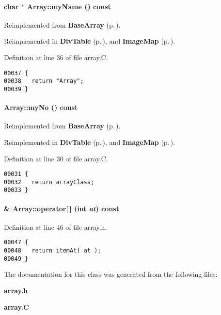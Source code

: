 \paragraph{\setlength{\rightskip}{0pt plus 5cm}char $\ast$ Array::my\-Name () const\hspace{0.3cm}{\tt  [virtual]}}\hfill



Reimplemented from {\bf Base\-Array} {\rm (p.\,\pageref{BaseArray_a11})}.

Reimplemented in {\bf Div\-Table} {\rm (p.\,\pageref{DivTable_a3})}, and {\bf Image\-Map} {\rm (p.\,\pageref{ImageMap_a3})}.

Definition at line 36 of file array.C.\small\begin{verbatim}00037 {
00038   return "Array";
00039 }
\end{verbatim}\normalsize 
\label{Array_a5}
\paragraph{ Array::my\-No () const\hspace{0.3cm}{\tt  [virtual]}}\hfill



Reimplemented from {\bf Base\-Array} {\rm (p.\,\pageref{BaseArray_a10})}.

Reimplemented in {\bf Div\-Table} {\rm (p.\,\pageref{DivTable_a2})}, and {\bf Image\-Map} {\rm (p.\,\pageref{ImageMap_a2})}.

Definition at line 30 of file array.C.\small\begin{verbatim}00031 {
00032   return arrayClass; 
00033 }
\end{verbatim}\normalsize 
\label{Array_a2}
\paragraph{ \& Array::operator[$\,$] (int {\em at}) const\hspace{0.3cm}{\tt  [inline]}}\hfill



Definition at line 46 of file array.h.\small\begin{verbatim}00047 {
00048   return itemAt( at );
00049 }
\end{verbatim}\normalsize 


The documentation for this class was generated from the following files:\begin{CompactItemize}
\item 
{\bf array.h}\item 
{\bf array.C}\end{CompactItemize}
